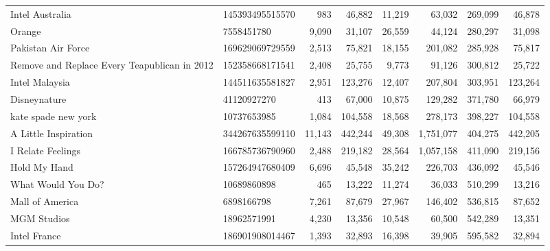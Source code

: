 \begin{longtable}{llrrrrrr}
                                   Intel Australia &  145393495515570 &     983 &      46,882 &     11,219 &      63,032 &       269,099 &     46,878 \\
                                            Orange &       7558451780 &   9,090 &      31,107 &     26,559 &      44,124 &       280,297 &     31,098 \\
                                Pakistan Air Force &  169629069729559 &   2,513 &      75,821 &     18,155 &     201,082 &       285,928 &     75,817 \\
      Remove and Replace Every Teapublican in 2012 &  152358668171541 &   2,408 &      25,755 &      9,773 &      91,126 &       300,812 &     25,722 \\
                                    Intel Malaysia &  144511635581827 &   2,951 &     123,276 &     12,407 &     207,804 &       303,951 &    123,264 \\
                                      Disneynature &      41120927270 &     413 &      67,000 &     10,875 &     129,282 &       371,780 &     66,979 \\
                               kate spade new york &      10737653985 &   1,084 &     104,558 &     18,568 &     278,173 &       398,227 &    104,558 \\
                              A Little Inspiration &  344267635599110 &  11,143 &     442,244 &     49,308 &   1,751,077 &       404,275 &    442,205 \\
                                 I Relate Feelings &  166785736790960 &   2,488 &     219,182 &     28,564 &   1,057,158 &       411,090 &    219,156 \\
                                      Hold My Hand &  157264947680409 &   6,696 &      45,548 &     35,242 &     226,703 &       436,092 &     45,546 \\
                                What Would You Do? &      10689860898 &     465 &      13,222 &     11,274 &      36,033 &       510,299 &     13,216 \\
                                   Mall of America &       6898166798 &   7,261 &      87,679 &     27,967 &     146,402 &       536,815 &     87,652 \\
                                       MGM Studios &      18962571991 &   4,230 &      13,356 &     10,548 &      60,500 &       542,289 &     13,351 \\
                                      Intel France &  186901908014467 &   1,393 &      32,893 &     16,398 &      39,905 &       595,582 &     32,894 \\

\end{longtable}
